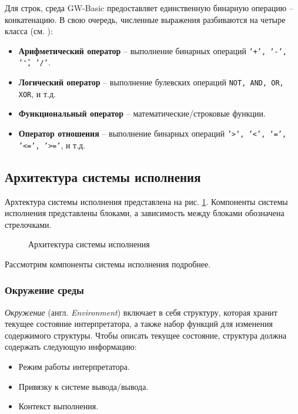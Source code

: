 \documentclass[12pt]{article}
\begin{document}
				\indent Для строк, среда GW-Basic предоставляет единственную бинарную операцию -- конкатенацию. В свою очередь, численные выражения разбиваются на четыре класса (см. \cite[стр.~46]{basicManual}):
				\begin{itemize}
					\item {\bf Арифметический оператор} -- выполнение бинарных операций {\tt '+', '-', '\^', '/'}.
					\item {\bf Логический оператор} -- выполнение булевских операций {\tt NOT, AND, OR, XOR}, и т.д. 
					\item {\bf Функциональный оператор} -- математические/строковые функции.
					\item {\bf Оператор отношения} -- выполнение бинарных операций {\tt '>', '<', '=', '<=', '>='}, и т.д.
				\end{itemize}
		\subsection{Архитектура системы исполнения}
			\label{subsec:runtimeArch}
			\hspace{\parindent} Архтектура системы исполнения представлена на рис. \ref{fig:runtimeArch}. Компоненты системы исполнения представлены блоками, а зависимость между блоками обозначена стрелочками. 	
			\begin{figure}[h]
				\caption{Архитектура системы исполнения}
				\label{fig:runtimeArch}
			\end{figure}
			
			\indent Рассмотрим компоненты системы исполнения подробнее. 
			
			\subsubsection{Окружение среды}
			\label{subsec:environment}
			\hspace{\parindent} {\it Окружение} (англ. {\it Environment}) включает в себя структуру, которая хранит текущее состояние интерпретатора, а также набор функций для изменения содержимого структуры. Чтобы описать текущее состояние, структура должна содержать следующую информацию:
			\begin{itemize}
				\item Режим работы интерпретатора.
				\item Привязку к системе вывода/вывода.
				\item Контекст выполнения.
			\end{itemize}
			
\end{document}
